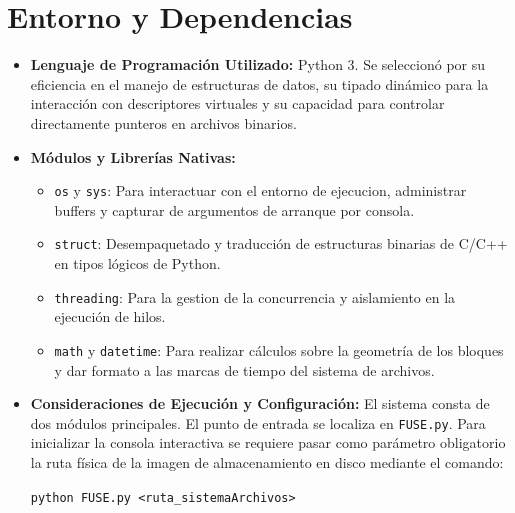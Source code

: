 \documentclass[11pt,a4paper]{article}
\begin{document}
\section{Entorno y Dependencias}
\begin{itemize}
    \item \textbf{Lenguaje de Programación Utilizado:} Python 3. Se seleccionó por su eficiencia en el manejo de estructuras de datos, su tipado dinámico para la interacción con descriptores virtuales y su capacidad para controlar directamente punteros en archivos binarios.
    \item \textbf{Módulos y Librerías Nativas:} 
        \begin{itemize}
            \item \texttt{os} y \texttt{sys}: Para interactuar con el entorno de ejecucion, administrar buffers y capturar de argumentos de arranque por consola.
            \item \texttt{struct}: Desempaquetado y traducción de estructuras binarias de C/C++ en tipos lógicos de Python.
            \item \texttt{threading}: Para la gestion de la concurrencia y aislamiento en la ejecución de hilos.
            \item \texttt{math} y \texttt{datetime}: Para realizar cálculos sobre la geometría de los bloques y dar formato a las marcas de tiempo del sistema de archivos.
        \end{itemize}
    \item \textbf{Consideraciones de Ejecución y Configuración:} El sistema consta de dos módulos principales. El punto de entrada se localiza en \texttt{FUSE.py}. Para inicializar la consola interactiva se requiere pasar como parámetro obligatorio la ruta física de la imagen de almacenamiento en disco mediante el comando:
    \begin{center}
        \texttt{python FUSE.py <ruta\_sistemaArchivos>}
    \end{center}
\end{itemize}
\end{document}

